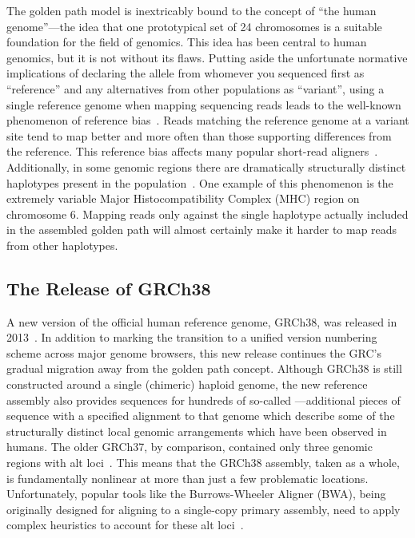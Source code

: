The golden path model is inextricably bound to the concept of ``the human genome''---the idea that one prototypical set of 24 chromosomes is a suitable foundation for the field of genomics. This idea has been central to human genomics, but it is not without its flaws. Putting aside the unfortunate normative implications of declaring the allele from whomever you sequenced first as ``reference'' and any alternatives from other populations as ``variant'', using a single reference genome when mapping sequencing reads leads to the well-known phenomenon of reference bias~\cite{degner2009effect,brandt2015mapping}. Reads matching the reference genome at a variant site tend to map better and more often than those supporting differences from the reference. This reference bias affects many popular short-read aligners~\cite{lunter2011stampy}. Additionally, in some genomic regions there are dramatically structurally distinct haplotypes present in the population~\cite{church2011modernizing}. One example of this phenomenon is the extremely variable Major Histocompatibility Complex (MHC) region on chromosome 6. Mapping reads only against the single haplotype actually included in the assembled golden path will almost certainly make it harder to map reads from other haplotypes.


\subsection{The Release of GRCh38}

A new version of the official human reference genome, GRCh38, was released in 2013~\cite{grc2013announcing}. In addition to marking the transition to a unified version numbering scheme across major genome browsers, this new release continues the GRC's gradual migration away from the golden path concept. Although GRCh38 is still constructed around a single (chimeric) haploid genome, the new reference assembly also provides sequences for hundreds of so-called ---additional pieces of sequence with a specified alignment to that genome which describe some of the structurally distinct local genomic arrangements which have been observed in humans. The older GRCh37, by comparison, contained only three genomic regions with alt loci~\cite{church2011modernizing}. This means that the GRCh38 assembly, taken as a whole, is fundamentally nonlinear at more than just a few problematic locations. Unfortunately, popular tools like the Burrows-Wheeler Aligner (BWA), being originally designed for aligning to a single-copy primary assembly, need to apply complex heuristics to account for these alt loci~\cite{li2014bwa,li2014new}.

